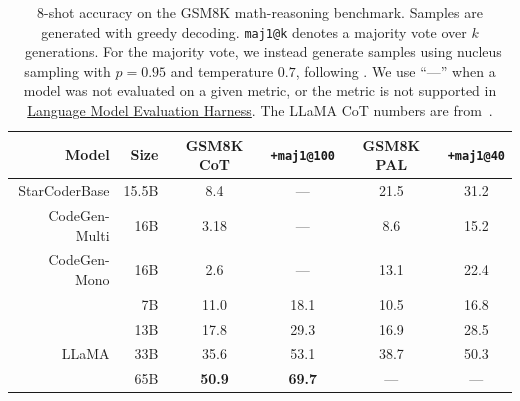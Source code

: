 \documentclass[10pt]{article} %
\begin{document}
\begin{table}
    \centering
    \begin{tabular}{rrcccc}
    \toprule 
    \textbf{Model} & \textbf{Size} & \textbf{GSM8K CoT} & \textbf{\small{\texttt{+maj1@100}}} & \textbf{GSM8K PAL} & \textbf{\small{\texttt{+maj1@40}}} \\
\midrule
    StarCoderBase & 15.5B & 8.4 & --- & 21.5 & 31.2 \\
\midrule
    CodeGen-Multi & 16B & 3.18 & --- & 8.6 & 15.2 \\
     CodeGen-Mono & 16B & 2.6 & --- & 13.1 & 22.4 \\
\midrule
   & 7B & 11.0 & 18.1 & 10.5 & 16.8 \\
    & 13B & 17.8 & 29.3 & 16.9 & 28.5 \\
    LLaMA & 33B & 35.6 & 53.1 & 38.7 & 50.3 \\
    & 65B & \textbf{50.9} & \textbf{69.7} & --- & ---\\
    \bottomrule
    \end{tabular}
    \caption{8-shot accuracy on the GSM8K math-reasoning benchmark.
    Samples are generated with greedy decoding.
    \texttt{maj1@k} denotes a majority vote over $k$~generations.
    For the majority vote, we instead generate samples using nucleus sampling with $p=0.95$ and temperature $0.7$, following \citet{gao2022pal}. We use ``---'' when a model was not evaluated on a given metric, or the metric is not supported in \href{https://github.com/EleutherAI/lm-evaluation-harness}{Language Model Evaluation Harness}. The LLaMA CoT numbers are from~\citet{touvron2023llama}.} %
    \label{tab:gsm8k}
\end{table}
\end{document}
